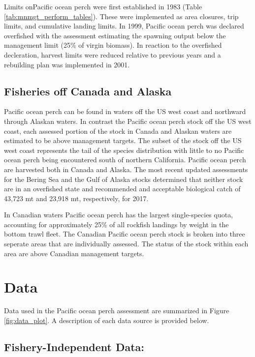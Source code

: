 \documentclass[12pt,]{article}
\begin{document}
Limits onPacific ocean perch were first established in 1983 (Table
\ref{tab:mnmgt_perform_tables}). These were implemented as area
closures, trip limits, and cumulative landing limits. In 1999, Pacific
ocean perch was declared overfished with the assessment estimating the
spawning output below the management limit (25\% of virgin biomass). In
reaction to the overfished decleration, harvest limits were reduced
relative to previous years and a rebuilding plan was implemented in
2001.

\subsection{Fisheries off Canada and
Alaska}\label{fisheries-off-canada-and-alaska}

Pacific ocean perch can be found in waters off the US west coast and
northward through Alaskan waters. In contrast the Pacific ocean perch
stock off the US west coast, each assessed portion of the stock in
Canada and Alaskan waters are estimated to be above management targets.
The subset of the stock off the US west coast represents the tail of the
species distribution with little to no Pacific ocean perch being
encountered south of northern California. Pacific ocean perch are
harvested both in Canada and Alaska. The most recent updated assessments
for the Bering Sea and the Gulf of Alaska stocks determined that neither
stock are in an overfished state and recommended and acceptable
biological catch of 43,723 mt and 23,918 mt, respectively, for 2017.

In Canadian waters Pacific ocean perch has the largest single-species
quota, accounting for approximately 25\% of all rockfish landings by
weight in the bottom trawl fleet. The Canadian Pacific ocean perch stock
is broken into three seperate areas that are individually assessed. The
status of the stock within each area are above Canadian management
targets.

\section{Data}\label{data}

Data used in the Pacific ocean perch assessment are summarized in Figure
\ref{fig:data_plot}. A description of each data source is provided
below.

\subsection{Fishery-Independent Data:}\label{fishery-independent-data}
\end{document}
